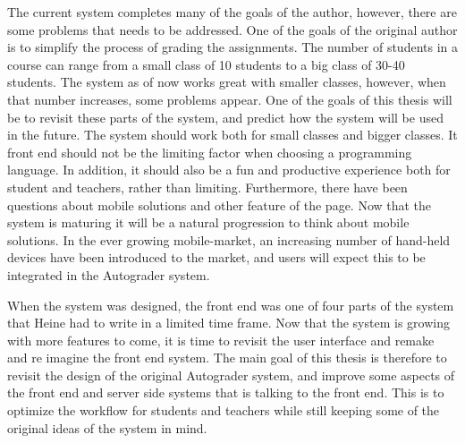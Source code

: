 \documentclass[12pt,a4paper]{report}
\begin{document}
The current system completes many of the goals of the author, however, there are some problems that needs to be addressed. One of the goals of the original author is to simplify the process of grading the assignments. The number of students in a course can range from a small class of 10 students to a big class of 30-40 students. The system as of now works great with smaller classes, however, when that number increases, some problems appear. One of the goals of this thesis will be to revisit these parts of the system, and predict how the system will be used in the future. The system should work both for small classes and bigger classes. It front end should not be the limiting factor when choosing a programming language. In addition, it should also be a fun and productive experience both for student and teachers, rather than limiting. Furthermore, there have been questions about mobile solutions and other feature of the page. Now that the system is maturing it will be a natural progression to think about mobile solutions. In the ever growing mobile-market, an increasing number of hand-held devices have been introduced to the market, and users will expect this to be integrated in the Autograder system.




 When the system was designed, the front end was one of four parts of the system that Heine had to write in a limited time frame. Now that the system is growing with more features to come, it is time to revisit the user interface and remake and re imagine the front end system. The main goal of this thesis is therefore to revisit the design of the original Autograder system, and improve some aspects of the front end and server side systems that is talking to the front end. This is to optimize the workflow for students and teachers while still keeping some of the original ideas of the system in mind.
\end{document}
